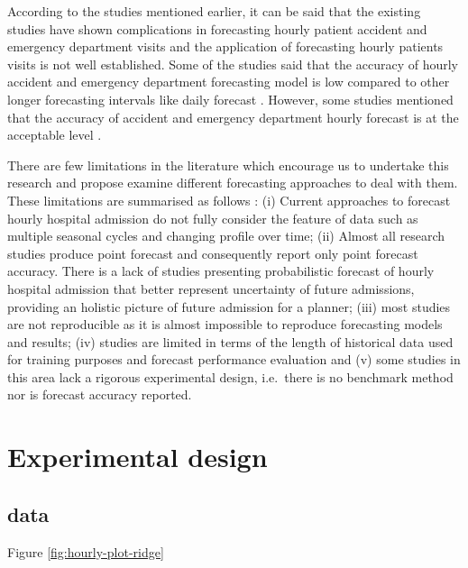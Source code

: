 \documentclass[]{elsarticle} %
\begin{document}
According to the studies mentioned earlier, it can be said that the existing studies have shown complications in forecasting hourly patient accident and emergency department visits and the application of forecasting hourly patients visits is not well established. Some of the studies said that the accuracy of hourly accident and emergency department forecasting model is low compared to other longer forecasting intervals like daily forecast \citep{boyle2012predicting, hertzum2017forecasting}. However, some studies mentioned that the accuracy of accident and emergency department hourly forecast is at the acceptable level \citep{choudhury2020forecasting, mccarthy2008challenge, schweigler2009forecasting}.

There are few limitations in the literature which encourage us to undertake this research and propose examine different forecasting approaches to deal with them. These limitations are summarised as follows : (i) Current approaches to forecast hourly hospital admission do not fully consider the feature of data such as multiple seasonal cycles and changing profile over time; (ii) Almost all research studies produce point forecast and consequently report only point forecast accuracy. There is a lack of studies presenting probabilistic forecast of hourly hospital admission that better represent uncertainty of future admissions, providing an holistic picture of future admission for a planner; (iii) most studies are not reproducible as it is almost impossible to reproduce forecasting models and results; (iv) studies are limited in terms of the length of historical data used for training purposes and forecast performance evaluation and (v) some studies in this area lack a rigorous experimental design, i.e.~there is no benchmark method nor is forecast accuracy reported.

\hypertarget{design}{%
\section{Experimental design}\label{design}}

\hypertarget{data}{%
\subsection{data}\label{data}}

Figure \ref{fig:hourly-plot-ridge}
\end{document}
